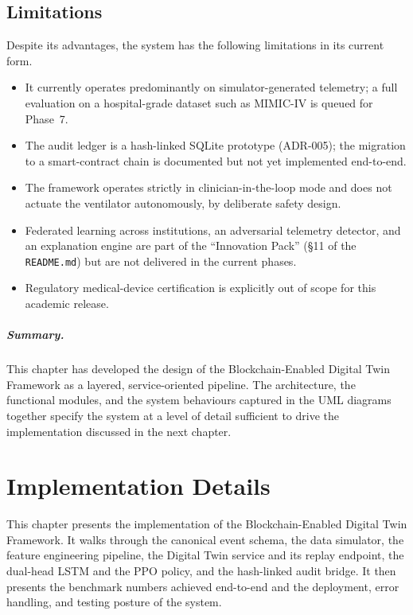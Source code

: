 \documentclass[12pt,a4paper,oneside]{report}
\begin{document}
\section{Limitations}
Despite its advantages, the system has the following limitations in its current form.
\begin{itemize}[leftmargin=*]
  \item It currently operates predominantly on simulator-generated telemetry; a full evaluation on a hospital-grade dataset such as MIMIC-IV is queued for Phase~7.
  \item The audit ledger is a hash-linked SQLite prototype (ADR-005); the migration to a smart-contract chain is documented but not yet implemented end-to-end.
  \item The framework operates strictly in clinician-in-the-loop mode and does not actuate the ventilator autonomously, by deliberate safety design.
  \item Federated learning across institutions, an adversarial telemetry detector, and an explanation engine are part of the ``Innovation Pack'' (\S 11 of the \texttt{README.md}) but are not delivered in the current phases.
  \item Regulatory medical-device certification is explicitly out of scope for this academic release.
\end{itemize}

\paragraph{Summary.} This chapter has developed the design of the Blockchain-Enabled Digital Twin Framework as a layered, service-oriented pipeline. The architecture, the functional modules, and the system behaviours captured in the UML diagrams together specify the system at a level of detail sufficient to drive the implementation discussed in the next chapter.

\chapter{Implementation Details}
\label{ch:impl}

This chapter presents the implementation of the Blockchain-Enabled Digital Twin Framework. It walks through the canonical event schema, the data simulator, the feature engineering pipeline, the Digital Twin service and its replay endpoint, the dual-head LSTM and the PPO policy, and the hash-linked audit bridge. It then presents the benchmark numbers achieved end-to-end and the deployment, error handling, and testing posture of the system.
\end{document}
